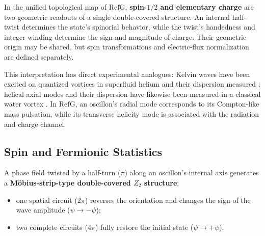 \documentclass[11pt,a4paper]{article}
\newcommand{\RefG}{\mathrm{RefG}}
\begin{document}
In the unified topological map of $\RefG$, \textbf{spin-$1/2$ and elementary charge} are two geometric readouts of a single double-covered structure. An internal half-twist determines the state's spinorial behavior, while the twist's handedness and integer winding determine the sign and magnitude of charge. Their geometric origin may be shared, but spin transformations and electric-flux normalization are defined separately.

This interpretation has direct experimental analogues: Kelvin waves have been excited on quantized vortices in superfluid helium and their dispersion measured \citep{minowa2025}; helical axial modes and their dispersion have likewise been measured in a classical water vortex \citep{barckicke2026}. In $\RefG$, an oscillon's radial mode corresponds to its Compton-like mass pulsation, while its transverse helicity mode is associated with the radiation and charge channel.

\subsection{Spin and Fermionic Statistics}

A phase field twisted by a half-turn ($\pi$) along an oscillon's internal axis generates a \textbf{Möbius-strip-type double-covered $Z_2$ structure}:
\begin{itemize}
\item one spatial circuit ($2\pi$) reverses the orientation and changes the sign of the wave amplitude ($\psi\to-\psi$);
\item two complete circuits ($4\pi$) fully restore the initial state ($\psi\to+\psi$).
\end{itemize}
\end{document}
